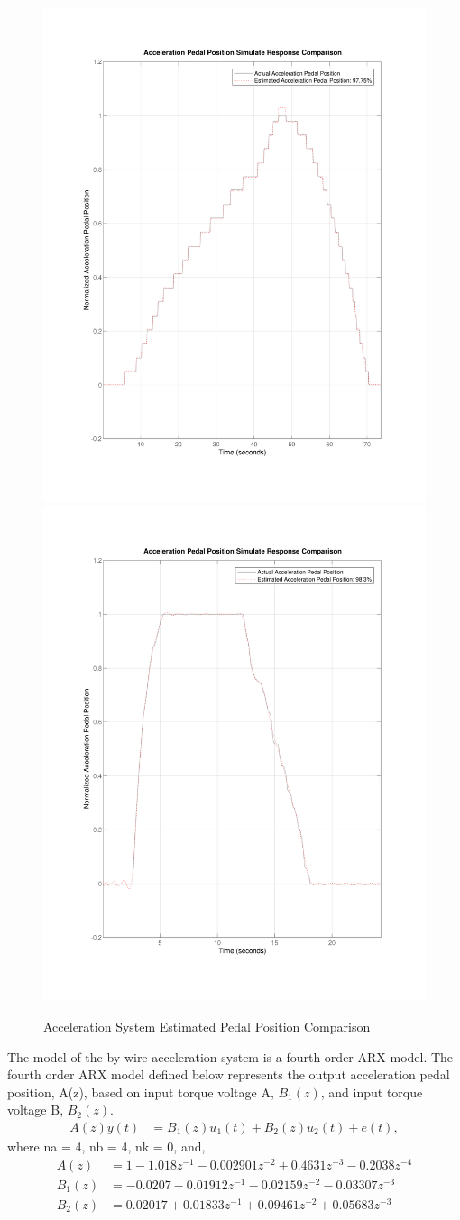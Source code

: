 \documentclass[letterpaper,12pt]{article}   %
\begin{document}
\begin{figure}[h]
	\centering
		{\includegraphics[width=0.48\linewidth]{figs/img/byWireAccelArxModel}}
		{\includegraphics[width=0.48\linewidth]{figs/img/manualAccelTransferFunctionModel}}
	\caption{Acceleration System Estimated Pedal Position Comparison}
\end{figure}

\vspace{12pt}
\noindent The model of the by-wire acceleration system is a fourth order ARX model. The fourth order ARX model defined below represents the output acceleration pedal position, A(z), based on input torque voltage A, $B_1(z)$, and input torque voltage B, $B_2(z)$. 
% 
	\begin{align*}
		A(z)y(t) &= B_1(z)u_1(t) + B_2(z)u_2(t) + e(t),
	\end{align*}
	where na = 4, nb = 4, nk = 0, and, 
  \begin{align*}
		A(z) &= 1 - 1.018z^{-1} - 0.002901z^{-2} + 0.4631z^{-3} - 0.2038z^{-4}\\
    B_1(z) &= -0.0207 - 0.01912z^{-1} - 0.02159z^{-2} - 0.03307z^{-3}\\
		B_2(z) &= 0.02017 + 0.01833z^{-1} + 0.09461z^{-2} + 0.05683z^{-3}
  \end{align*}
%
\end{document}
